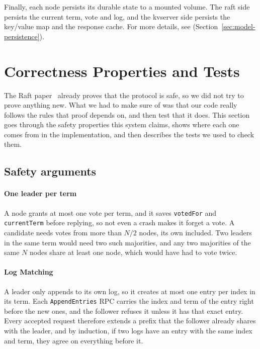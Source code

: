\documentclass[conference]{IEEEtran}
\begin{document}
Finally, each node persists its durable state to a mounted volume. The raft side persists the current term, vote and log, and the kvserver side persists the key/value map and the response cache. For more details, see (Section~\ref{sec:model-persistence}).

\section{Correctness Properties and Tests}
\label{sec:correct}
The Raft paper~\cite{raft2014} already proves that the protocol is safe, so we did not try to prove anything new. What we had to make sure of was that our code really follows the rules that proof depends on, and then test that it does. This section goes through the safety properties this system claims, shows where each one comes from in the implementation, and then describes the tests we used to check them.

\subsection{Safety arguments}
\label{sec:correct-safety}

\paragraph{One leader per term} A node grants at most one vote per term, and it saves \texttt{votedFor} and \texttt{currentTerm} before replying, so not even a crash makes it forget a vote. A candidate needs votes from more than $N/2$ nodes, its own included. Two leaders in the same term would need two such majorities, and any two majorities of the same $N$ nodes share at least one node, which would have had to vote twice.

\paragraph{Log Matching} A leader only appends to its own log, so it creates at most one entry per index in its term. Each \texttt{AppendEntries} RPC carries the index and term of the entry right before the new ones, and the follower refuses it unless it has that exact entry. Every accepted request therefore extends a prefix that the follower already shares with the leader, and by induction, if two logs have an entry with the same index and term, they agree on everything before it.
\end{document}
